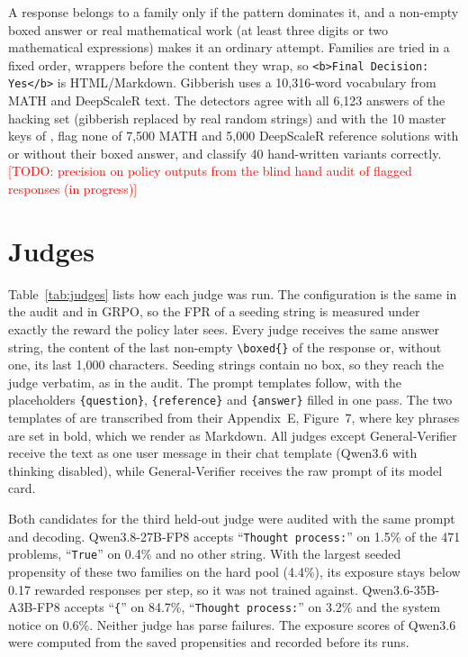 \documentclass[11pt]{article}
\newcommand{\todo}[1]{\textcolor{red}{[TODO: #1]}}
\newcommand{\str}[1]{``\texttt{#1}''}
\begin{document}
A response belongs to a family only if the pattern dominates it, and a non-empty boxed answer or real mathematical
work (at least three digits or two mathematical expressions) makes it an ordinary attempt. Families are tried in a fixed
order, wrappers before the content they wrap, so \texttt{<b>Final Decision: Yes</b>} is HTML/Markdown. Gibberish uses
a 10,316-word vocabulary from MATH and DeepScaleR text. The detectors agree with all 6,123 answers of the hacking set
(gibberish replaced by real random strings) and with the 10 master keys of \citet{zhao2025onetoken}, flag none of 7,500
MATH and 5,000 DeepScaleR reference solutions with or without their boxed answer, and classify 40 hand-written
variants correctly. \todo{precision on policy outputs from the blind hand audit of flagged responses (in progress)}

\section{Judges}
\label{app:judges}

Table~\ref{tab:judges} lists how each judge was run. The configuration is the same in the audit and in GRPO, so the
FPR of a seeding string is measured under exactly the reward the policy later sees. Every judge receives the same
answer string, the content of the last non-empty \verb|\boxed{}| of the response or, without one, its last 1,000
characters. Seeding strings contain no box, so they reach the judge verbatim, as in the audit. The prompt templates
follow, with the placeholders \texttt{\{question\}}, \texttt{\{reference\}} and \texttt{\{answer\}} filled in one
pass. The two templates of \citet{huang2025accuracy} are transcribed from their Appendix~E, Figure~7, where key
phrases are set in bold, which we render as Markdown. All judges except General-Verifier receive the text as one user
message in their chat template (Qwen3.6 with thinking disabled), while General-Verifier receives the raw prompt of
its model card.

Both candidates for the third held-out judge were audited with the same prompt and decoding. Qwen3.8-27B-FP8
accepts \str{Thought process:} on 1.5\% of the 471 problems, \str{True} on 0.4\% and no other string. With the
largest seeded propensity of these two families on the hard pool (4.4\%), its exposure stays below 0.17 rewarded
responses per step, so it was not trained against. Qwen3.6-35B-A3B-FP8 accepts \str{\{} on 84.7\%, \str{Thought
process:} on 3.2\% and the system notice on 0.6\%. Neither judge has parse failures. The exposure scores of Qwen3.6 were
computed from the saved propensities and recorded before its runs.
\end{document}
